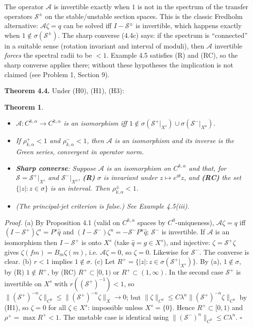 \documentclass[11pt,a4paper]{article}
\theoremstyle{plain}
\newtheorem{theorem}{Theorem}[section]
\theoremstyle{definition}
\theoremstyle{remark}
\numberwithin{equation}{section}
\numberwithin{figure}{section}
\begin{document}
The operator $\mathcal A$ is invertible exactly when $1$ is not in the spectrum of the transfer operators $\mathcal S^\pm$ on the stable/unstable section spaces. This is the classic Fredholm alternative: $\mathcal A\zeta=q$ can be solved iff $I-\mathcal S^\pm$ is invertible, which happens exactly when $1\notin\sigma(\mathcal S^\pm)$. The sharp converse (4.4c) says: if the spectrum is ``connected'' in a suitable sense (rotation invariant and interval of moduli), then $\mathcal A$ invertible \textit{forces} the spectral radii to be $<1$. Example 4.5 satisfies (R) and (RC), so the sharp converse applies there; without these hypotheses the implication is not claimed (see Problem 1, Section 9).

\textbf{Theorem 4.4.} Under (H0), (H1), (H3):

\begin{theorem}
    \begin{itemize}
        \item[(a)] $\mathcal A:C^{k,\alpha}\to C^{k,\alpha}$ is an isomorphism iff $1\notin\sigma(\mathcal S^+|_{X^s})\cup\sigma(\mathcal S^-|_{X^u})$.
        \item[(b)] If $\rho^+_{k,\alpha}<1$ and $\rho^-_{k,\alpha}<1$, then $\mathcal A$ is an isomorphism and its inverse is the Green series, convergent in operator norm.
        \item[(c)] \textbf{Sharp converse}: Suppose $\mathcal A$ is an isomorphism on $C^{k,\alpha}$ and that, for $\mathcal S=\mathcal S^+|_{X^s}$ and $\mathcal S^-|_{X^u}$, \textbf{(R)} $\sigma$ is invariant under $z\mapsto e^{i\theta}z$, and \textbf{(RC)} the set $\{|z|:z\in\sigma\}$ is an interval. Then $\rho^\pm_{k,\alpha}<1$.
        \item[(d)] (The principal-jet criterion is false.) See Example 4.5(iii).
    \end{itemize}
\end{theorem}

\textit{Proof.} (a) By Proposition 4.1 (valid on $C^{k,\alpha}$ spaces by $C^0$-uniqueness), $\mathcal A\zeta=q$ iff $(I-\mathcal S^+)\zeta^s=P^s\hat q$ and $(I-\mathcal S^-)\zeta^u=-\mathcal S^-P^u\hat q$; $\mathcal S^-$ is invertible. If $\mathcal A$ is an isomorphism then $I-\mathcal S^+$ is onto $X^s$ (take $\hat q=g\in X^s$), and injective: $\zeta=\mathcal S^+\zeta$ gives $\zeta(fm)=B_m\zeta(m)$, i.e. $\mathcal A\zeta=0$, so $\zeta=0$. Likewise for $\mathcal S^-$. The converse is clear.
(b) $r<1$ implies $1\notin\sigma$.
(c) Let $R^+=\{|z|:z\in\sigma(\mathcal S^+|_{X^s})\}$. By (a), $1\notin\sigma$, by (R) $1\notin R^+$, by (RC) $R^+\subset[0,1)$ or $R^+\subset(1,\infty)$. In the second case $\mathcal S^+$ is invertible on $X^s$ with $r((\mathcal S^+)^{-1})<1$, so $\|(\mathcal S^+)^{-n}\zeta\|_{C^0}\le\|(\mathcal S^+)^{-n}\zeta\|_{X}\to0$; but $\|\zeta\|_{C^0}\le C\lambda^n\|(\mathcal S^+)^{-n}\zeta\|_{C^0}$ by (H1), so $\zeta=0$ for all $\zeta\in X^s$: impossible unless $X^s=\{0\}$. Hence $R^+\subset[0,1)$ and $\rho^+=\max R^+<1$. The unstable case is identical using $\|(\mathcal S^-)^n\|_{C^0}\le C\lambda^n$. $\square$
\end{document}
